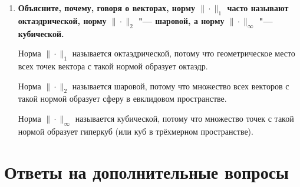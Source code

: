 \documentclass[12pt, a4paper]{article}
\begin{document}
\begin{enumerate}
	\item \textbf{Объясните, почему, говоря о векторах, норму $\| \cdot \|_1$ часто
	называют октаэдрической, норму  $\| \cdot \|_2$ "--- шаровой, а норму
	 $\| \cdot \|_{\infty}$ "--- кубической.}
	 
	 	Норма $\|\cdot\|_1$ называется октаэдрической, потому что геометрическое место всех точек вектора с такой нормой образует октаэдр.
	 	
	 	Норма $\|\cdot\|_2$ называется шаровой, потому что множество всех векторов с такой нормой образует сферу в евклидовом пространстве.
	 	
	 	Норма $\|\cdot\|_{\infty}$ называется кубической, потому что множество точек с такой нормой образует гиперкуб (или куб в трёхмерном пространстве).
	 
	\end{enumerate}
	
	\section{Ответы на дополнительные вопросы}
	
\end{document}
